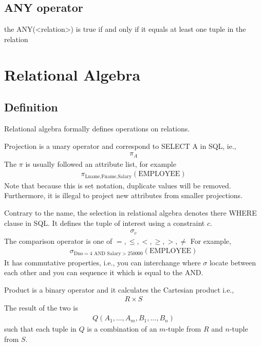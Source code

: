 \documentclass[a4paper]{article}
\theoremstyle{plain}
\theoremstyle{definition}
\newtheorem{defn}{Definition}[section]
\theoremstyle{remark}
\begin{document}
\subsection{ANY operator}
the ANY(<relation>) is true if and only if it equals at least one tuple in the relation
\section{Relational Algebra}
\subsection{Definition}
Relational algebra formally defines operations on relations. 
\begin{tcolorbox}[colback=black!3!white,colframe=black!60!white,title=\begin{defn}Projection \label{Projection}\end{defn}]
Projection is a unary operator and correspond to SELECT A in SQL, ie.,
\begin{align}
\pi_A
\end{align}
The $\pi$ is usually followed an attribute list, for example
\begin{align}
	\pi_{\text{Lname,Fname,Salary}}(\text{EMPLOYEE})
\end{align}
Note that because this is set notation, duplicate values will be removed. Furthermore, it is illegal to project new attributes from smaller projections.
\end{tcolorbox}
\begin{tcolorbox}[colback=black!3!white,colframe=black!60!white,title=\begin{defn}Selection \label{Selection}\end{defn}]
Contrary to the name, the selection in relational algebra denotes there WHERE clause in SQL. It defines the tuple of interest using a constraint $c$.
\begin{align}
\sigma_c
\end{align}
 The comparison operator is one of $=,\le ,<,\ge ,>,\neq $
 For example,
 \begin{align}
 	\sigma_{\text{Dno}=4\text{ AND } \text{Salary}>250000}(\text{EMPLOYEE})
 \end{align}
 It has commutative properties, i.e., you can interchange where $\sigma$ locate between each other and you can sequence it which is equal to the AND. 
\end{tcolorbox}
\begin{tcolorbox}[colback=black!3!white,colframe=black!60!white,title=\begin{defn}Product \label{Product}\end{defn}]
Product is a binary operator and it calculates the Cartesian product i.e.,
\begin{align}
R \times S
\end{align}
The result of the two is
\begin{align}
	Q(A_1,\ldots,A_m,B_1,\ldots,B_n)
\end{align}
such that each tuple in $Q$ is a combination of an $m$-tuple from $R$ and $n$-tuple from $S$.
\end{tcolorbox}
\end{document}
